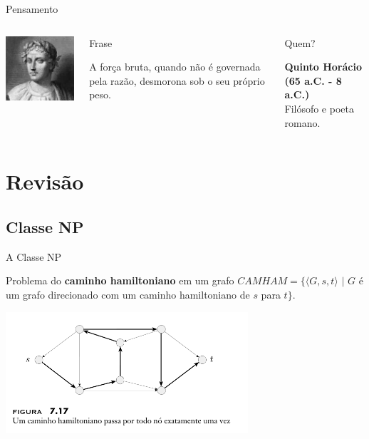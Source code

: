 \documentclass[xcolor=dvipsnames,table]{beamer}
\begin{document}
	\begin{frame}{Pensamento}
		\begin{columns}
		  		\begin{center}
		    		\includegraphics[height=.5\textheight]{images/horacio.jpg}
		  		\end{center}
				\begin{block}{Frase}
					\begin{center}
						{\large A força bruta, quando não é governada pela razão, desmorona sob o seu próprio peso.}
					\end{center}
				\end{block}		  		
		  		\begin{block}{Quem?}
		  			\begin{center}
						{\bf Quinto Horácio (65 a.C. - 8 a.C.)} \\ Filósofo e poeta romano.
					\end{center}
				\end{block}
		\end{columns}
	\end{frame}
	

\section{Revisão}
	
	\subsection{Classe NP}				
	
	\begin{frame}{A Classe NP}
		\begin{block}{Problema do {\bf caminho hamiltoniano} em um grafo}
			$CAMHAM = \{ \langle G, s, t \rangle \mbox{ | } G$ é um grafo direcionado com um caminho hamiltoniano de $s$ para $t \}$.
		\end{block}
		\begin{center}
			\includegraphics[width=9cm]{images/camHam.png}
		\end{center}
	\end{frame}	
	
\end{document}
